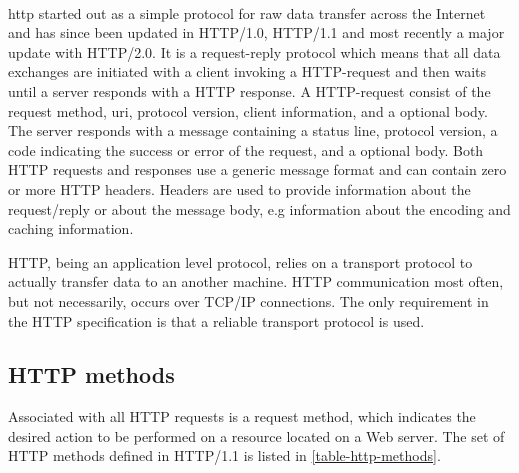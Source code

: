 \paragraph{}

\gls{http} started out as a simple protocol for raw data transfer across the
Internet and has since been updated in HTTP/1.0, HTTP/1.1 and most recently a
major update with HTTP/2.0. It is a request-reply protocol which means that all
data exchanges are initiated with a client invoking a HTTP-request and then
waits until a server responds with a HTTP response. A HTTP-request consist of
the request method, \gls{uri}, protocol version, client information, and a optional
body. The server responds with a message containing a status line, protocol
version, a code indicating the success or error of the request, and a optional
body. Both HTTP requests and responses use a generic message format and can
contain zero or more HTTP headers. Headers are used to provide information about
the request/reply or about the message body, e.g information about the encoding
and caching information.

HTTP, being an application level protocol, relies on a transport protocol to
actually transfer data to an another machine. HTTP communication most often, but
not necessarily, occurs over TCP/IP connections. The only requirement in the HTTP
specification is that a reliable transport protocol is used.

\subsection{HTTP methods}

 Associated with all HTTP requests is a request method, which indicates the
 desired action to be performed on a resource located on a Web server. The set
 of HTTP methods defined in HTTP/1.1 is listed in \cref{table-http-methods}.

